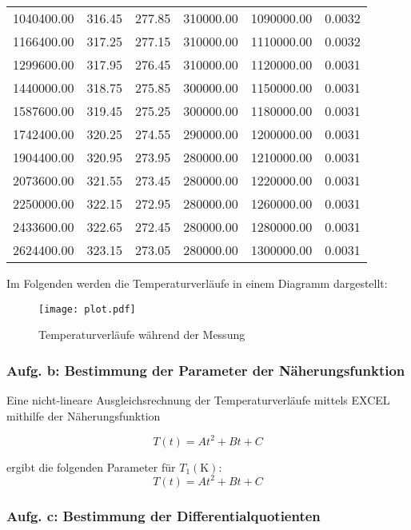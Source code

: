 \begin{table}
\begin{tabular}{c c c c c c}
    1040400.00 &  316.45 &  277.85 & 310000.00 & 1090000.00 &      0.0032 \\
    1166400.00 &  317.25 &  277.15 & 310000.00 & 1110000.00 &      0.0032 \\
    1299600.00 &  317.95 &  276.45 & 310000.00 & 1120000.00 &      0.0031 \\
    1440000.00 &  318.75 &  275.85 & 300000.00 & 1150000.00 &      0.0031 \\
    1587600.00 &  319.45 &  275.25 & 300000.00 & 1180000.00 &      0.0031 \\
    1742400.00 &  320.25 &  274.55 & 290000.00 & 1200000.00 &      0.0031 \\
    1904400.00 &  320.95 &  273.95 & 280000.00 & 1210000.00 &      0.0031 \\
    2073600.00 &  321.55 &  273.45 & 280000.00 & 1220000.00 &      0.0031 \\
    2250000.00 &  322.15 &  272.95 & 280000.00 & 1260000.00 &      0.0031 \\
    2433600.00 &  322.65 &  272.45 & 280000.00 & 1280000.00 &      0.0031 \\
    2624400.00 &  323.15 &  273.05 & 280000.00 & 1300000.00 &      0.0031 \\
    \bottomrule
  \end{tabular}
\end{table}

\newpage


Im Folgenden werden die Temperaturverläufe in einem Diagramm dargestellt:

\begin{figure}
  \centering
  \texttt{[image: plot.pdf]}
  \caption{Temperaturverläufe während der Messung}
  \label{fig:plot}
\end{figure}

\subsubsection{Aufg. b: Bestimmung der Parameter der Näherungsfunktion}

Eine nicht-lineare Ausgleichsrechnung der Temperaturverläufe mittels EXCEL mithilfe der Näherungsfunktion

\begin{equation} 
  T(t) = At^2 + Bt + C 
\end{equation}

ergibt die folgenden Parameter für $T_{1} (\unit{\kelvin})$:
\begin{equation} 
  T(t) = At^2 + Bt + C 
\end{equation}


\subsubsection{Aufg. c: Bestimmung der Differentialquotienten}

